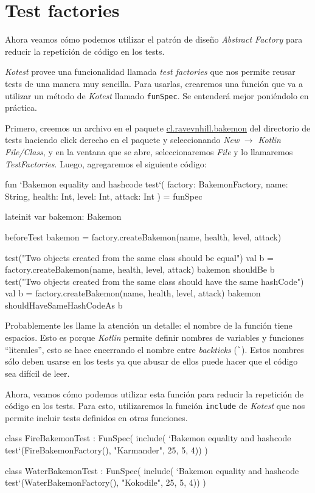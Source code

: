 \section{Test factories}
\label{sec:test-factories}
  Ahora veamos cómo podemos utilizar el patrón de diseño \textit{Abstract Factory} para reducir la
  repetición de código en los tests.

  \textit{Kotest} provee una funcionalidad llamada \textit{test factories} que nos permite
  reusar tests de una manera muy sencilla.
  Para usarlas, crearemos una función que va a utilizar un método de \textit{Kotest} llamado
  \texttt{funSpec}.
  Se entenderá mejor poniéndolo en práctica.

  Primero, creemos un archivo en el paquete \url{cl.ravevnhill.bakemon} del directorio de tests 
  haciendo click derecho en el paquete y seleccionando \textit{New} \(\rightarrow\) 
  \textit{Kotlin File/Class}, y en la ventana que se abre, seleccionaremos \textit{File} y
  lo llamaremos \textit{TestFactories}.
  Luego, agregaremos el siguiente código:

  \begin{kotlin}
    fun `Bakemon equality and hashcode test`(
      factory: BakemonFactory,
      name: String,
      health: Int,
      level: Int,
      attack: Int
    ) = funSpec {
      lateinit var bakemon: Bakemon

      beforeTest {
        bakemon = factory.createBakemon(name, health, level, attack)
      }

      test("Two objects created from the same class should be equal") {
        val b = factory.createBakemon(name, health, level, attack)
        bakemon shouldBe b
      }
      test("Two objects created from the same class should have the same hashCode") {
        val b = factory.createBakemon(name, health, level, attack)
        bakemon shouldHaveSameHashCodeAs b
      }
    }
  \end{kotlin}

  Probablemente les llame la atención un detalle: el nombre de la función tiene espacios.
  Esto es porque \textit{Kotlin} permite definir nombres de variables y funciones 
  \enquote{literales}, esto se hace encerrando el nombre entre \textit{backticks} (\texttt{\`{}}).
  Estos nombres sólo deben usarse en los tests\autocite{CodingConventionsKotlin} ya que abusar de
  ellos puede hacer que el código sea difícil de leer.

  Ahora, veamos cómo podemos utilizar esta función para reducir la repetición de código en los 
  tests.
  Para esto, utilizaremos la función \texttt{include} de \textit{Kotest} que nos permite incluir
  tests definidos en otras funciones.

  \begin{kotlin}
    class FireBakemonTest : FunSpec({
      include(
        `Bakemon equality and hashcode test`(FireBakemonFactory(), "Karmander", 25, 5, 4))
    })
  \end{kotlin}

  \begin{kotlin}
    class WaterBakemonTest : FunSpec({
      include(
        `Bakemon equality and hashcode test`(WaterBakemonFactory(), "Kokodile", 25, 5, 4))
    })
  \end{kotlin}

  
